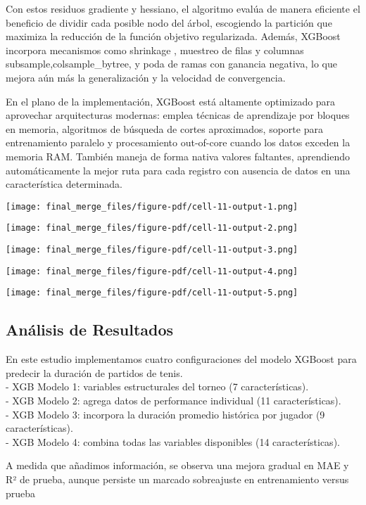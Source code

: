 \documentclass[
  letterpaper,
  DIV=11,
  numbers=noendperiod]{scrartcl}
\begin{document}
Con estos residuos gradiente y hessiano, el algoritmo evalúa de manera
eficiente el beneficio de dividir cada posible nodo del árbol,
escogiendo la partición que maximiza la reducción de la función objetivo
regularizada. Además, XGBoost incorpora mecanismos como shrinkage ,
muestreo de filas y columnas subsample,colsample\_bytree, y poda de
ramas con ganancia negativa, lo que mejora aún más la generalización y
la velocidad de convergencia.

En el plano de la implementación, XGBoost está altamente optimizado para
aprovechar arquitecturas modernas: emplea técnicas de aprendizaje por
bloques en memoria, algoritmos de búsqueda de cortes aproximados,
soporte para entrenamiento paralelo y procesamiento out-of-core cuando
los datos exceden la memoria RAM. También maneja de forma nativa valores
faltantes, aprendiendo automáticamente la mejor ruta para cada registro
con ausencia de datos en una característica determinada.

\texttt{[image: final\_merge\_files/figure-pdf/cell-11-output-1.png]}

\texttt{[image: final\_merge\_files/figure-pdf/cell-11-output-2.png]}

\texttt{[image: final\_merge\_files/figure-pdf/cell-11-output-3.png]}

\texttt{[image: final\_merge\_files/figure-pdf/cell-11-output-4.png]}

\texttt{[image: final\_merge\_files/figure-pdf/cell-11-output-5.png]}

\hypertarget{anuxe1lisis-de-resultados-1}{%
\subsection{Análisis de Resultados}\label{anuxe1lisis-de-resultados-1}}

En este estudio implementamos cuatro configuraciones del modelo XGBoost
para predecir la duración de partidos de tenis.\\
- XGB Modelo 1: variables estructurales del torneo (7
características).\\
- XGB Modelo 2: agrega datos de performance individual (11
características).\\
- XGB Modelo 3: incorpora la duración promedio histórica por jugador (9
características).\\
- XGB Modelo 4: combina todas las variables disponibles (14
características).

A medida que añadimos información, se observa una mejora gradual en MAE
y R² de prueba, aunque persiste un marcado sobreajuste en entrenamiento
versus prueba
\end{document}
